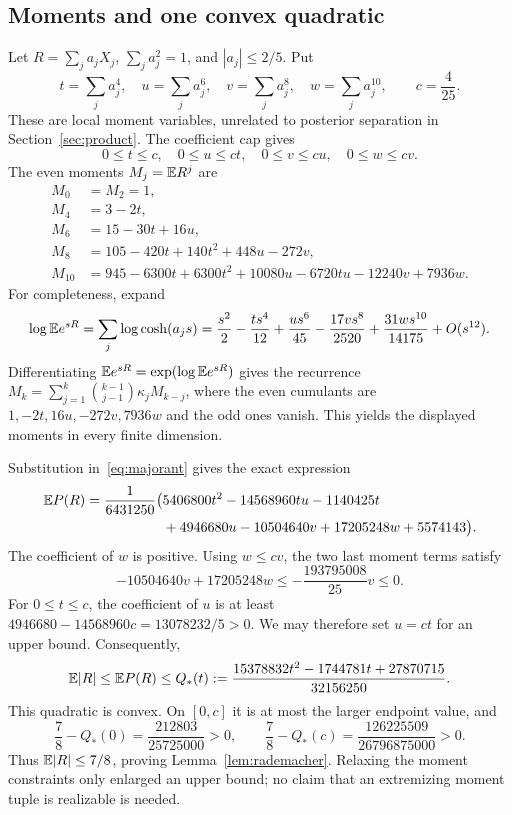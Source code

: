 \subsection{Moments and one convex quadratic}
Let $R=\sum_j a_jX_j$, $\sum_j a_j^2=1$, and $|a_j|\le2/5$. Put
\[
t=\sum_j a_j^4,\quad u=\sum_j a_j^6,\quad v=\sum_j a_j^8,\quad w=\sum_j a_j^{10},\qquad c=\frac4{25}.
\]
These are local moment variables, unrelated to posterior separation in Section~\ref{sec:product}. The coefficient cap gives
\[
0\le t\le c,\quad 0\le u\le ct,\quad 0\le v\le cu,\quad 0\le w\le cv.
\]
The even moments $M_j=\mathbb E R^j$ are
\begin{align*}
M_0&=M_2=1,\\
M_4&=3-2t,\\
M_6&=15-30t+16u,\\
M_8&=105-420t+140t^2+448u-272v,\\
M_{10}&=945-6300t+6300t^2+10080u-6720tu-12240v+7936w.
\end{align*}
For completeness, expand
\[
\log\mathbb E e^{sR}=\sum_j\log\cosh(a_js)
=\frac{s^2}{2}-\frac{ts^4}{12}+\frac{us^6}{45}
-\frac{17vs^8}{2520}+\frac{31ws^{10}}{14175}+O(s^{12}).
\]
Differentiating $\mathbb E e^{sR}=\exp(\log\mathbb E e^{sR})$ gives the recurrence
$M_k=\sum_{j=1}^k\binom{k-1}{j-1}\kappa_j M_{k-j}$, where the even cumulants are
$1,-2t,16u,-272v,7936w$ and the odd ones vanish. This yields the displayed moments in every finite dimension.

Substitution in~\eqref{eq:majorant} gives the exact expression
\begin{align}\label{eq:expectedmajorant}
\mathbb E P(R)=\frac1{6431250}\big(&5406800t^2-14568960tu-1140425t\notag\\
&+4946680u-10504640v+17205248w+5574143\big).
\end{align}
The coefficient of $w$ is positive. Using $w\le cv$, the two last moment terms satisfy
\[
-10504640v+17205248w\le-\frac{193795008}{25}v\le0.
\]
For $0\le t\le c$, the coefficient of $u$ is at least
$4946680-14568960c=13078232/5>0$. We may therefore set $u=ct$ for an upper bound. Consequently,
\begin{equation}\label{eq:momentquadratic}
\mathbb E|R|\le\mathbb E P(R)\le Q_*(t):=
\frac{15378832t^2-1744781t+27870715}{32156250}.
\end{equation}
This quadratic is convex. On $[0,c]$ it is at most the larger endpoint value, and
\[
\frac78-Q_*(0)=\frac{212803}{25725000}>0,\qquad
\frac78-Q_*(c)=\frac{126225509}{26796875000}>0.
\]
Thus $\mathbb E|R|\le7/8$, proving Lemma~\ref{lem:rademacher}. Relaxing the moment constraints only enlarged an upper bound; no claim that an extremizing moment tuple is realizable is needed.

